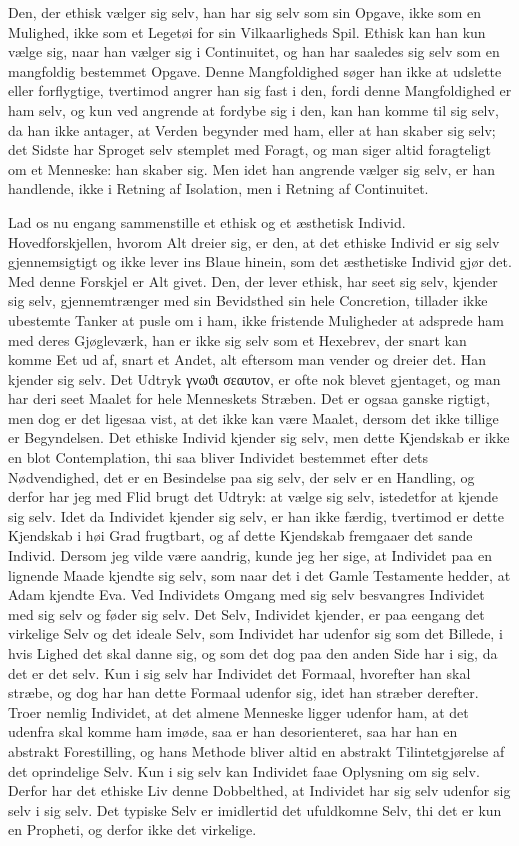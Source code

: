 \documentclass[12pt,a4paper]{article}
\begin{document}
Den, der ethisk vælger sig selv, han har sig selv som sin Opgave, ikke som en Mulighed, ikke som et Legetøi for sin Vilkaarligheds Spil. Ethisk kan han kun vælge sig, naar han vælger sig i Continuitet, og han har saaledes sig selv som en mangfoldig bestemmet Opgave. Denne Mangfoldighed søger han ikke at udslette eller forflygtige, tvertimod angrer han sig fast i den, fordi denne Mangfoldighed er ham selv, og kun ved angrende at fordybe sig i den, kan han komme til sig selv, da han ikke antager, at Verden begynder med ham, eller at han skaber sig selv; det Sidste har Sproget selv stemplet med Foragt, og man siger altid foragteligt om et Menneske: han skaber sig. Men idet han angrende vælger sig selv, er han handlende, ikke i Retning af Isolation, men i Retning af Continuitet.

Lad os nu engang sammenstille et ethisk og et æsthetisk Individ. Hovedforskjellen, hvorom Alt dreier sig, er den, at det ethiske Individ er sig selv gjennemsigtigt og ikke lever ins Blaue hinein, som det æsthetiske Individ gjør det. Med denne Forskjel er Alt givet. Den, der lever ethisk, har seet sig selv, kjender sig selv, gjennemtrænger med sin Bevidsthed sin hele Concretion, tillader ikke ubestemte Tanker at pusle om i ham, ikke fristende Muligheder at adsprede ham med deres Gjøgleværk, han er ikke sig selv som et Hexebrev, der snart kan komme Eet ud af, snart et Andet, alt eftersom man vender og dreier det. Han kjender sig selv. Det Udtryk γνωϑι σεαυτον, er ofte nok blevet gjentaget, og man har deri seet Maalet for hele Menneskets Stræben. Det er ogsaa ganske rigtigt, men dog er det ligesaa vist, at det ikke kan være Maalet, dersom det ikke tillige er Begyndelsen. Det ethiske Individ kjender sig selv, men dette Kjendskab er ikke en blot Contemplation, thi saa bliver Individet bestemmet efter dets Nødvendighed, det er en Besindelse paa sig selv, der selv er en Handling, og derfor har jeg med Flid brugt det Udtryk: at vælge sig selv, istedetfor at kjende sig selv. Idet da Individet kjender sig selv, er han ikke færdig, tvertimod er dette Kjendskab i høi Grad frugtbart, og af dette Kjendskab fremgaaer det sande Individ. Dersom jeg vilde være aandrig, kunde jeg her sige, at Individet paa en lignende Maade kjendte sig selv, som naar det i det Gamle Testamente hedder, at Adam kjendte Eva. Ved Individets Omgang med sig selv besvangres Individet med sig selv og føder sig selv. Det Selv, Individet kjender, er paa eengang det virkelige Selv og det ideale Selv, som Individet har udenfor sig som det Billede, i hvis Lighed det skal danne sig, og som det dog paa den anden Side har i sig, da det er det selv. Kun i sig selv har Individet det Formaal, hvorefter han skal stræbe, og dog har han dette Formaal udenfor sig, idet han stræber derefter. Troer nemlig Individet, at det almene Menneske ligger udenfor ham, at det udenfra skal komme ham imøde, saa er han desorienteret, saa har han en abstrakt Forestilling, og hans Methode bliver altid en abstrakt Tilintetgjørelse af det oprindelige Selv. Kun i sig selv kan Individet faae Oplysning om sig selv. Derfor har det ethiske Liv denne Dobbelthed, at Individet har sig selv udenfor sig selv i sig selv. Det typiske Selv er imidlertid det ufuldkomne Selv, thi det er kun en Propheti, og derfor ikke det virkelige. 
\end{document}

